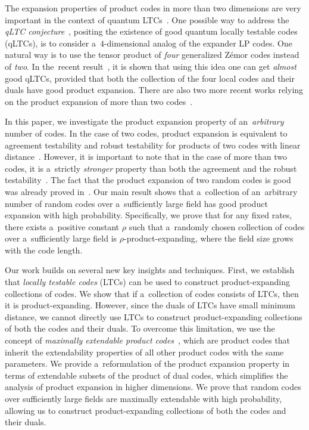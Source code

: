 \documentclass[conference]{IEEEtran}
\theoremstyle{plain}
\theoremstyle{definition}
\theoremstyle{remark}
\begin{document}
The expansion properties of product codes in more than two dimensions are very important in the context of quantum LTCs~\cite{Aharonov:2015}. One possible way to address the \emph{qLTC conjecture}~\cite{eldarLocalHamiltoniansWhose2017,crossQuantumLocallyTestable2024, dinurqLTC:2024}, positing the existence of good quantum locally testable codes (qLTCs), is to consider a~$4$-dimensional analog of the expander LP codes. One natural way is to use the tensor product of \emph{four} generalized Z\'{e}mor codes instead of \emph{two}.  In the~recent result~\cite{dinurqLTC:2024}, it is shown that using this idea one can get \emph{almost} good qLTCs, provided that both the collection of the four local codes and their duals have good product expansion. There are also two more recent works relying on the product expansion of more than two codes~\cite{golowichQuantumLDPCCodes2024, nguyenQuantumFaultTolerance2024}.

In this paper, we investigate the product expansion property of an~\emph{arbitrary} number of codes. In the case of two codes, product expansion is equivalent to agreement testability and robust testability for products of two codes with linear distance~\cite{kalachevTwosidedRobustlyTestable2023}. However, it is important to note that in the case of more than two codes, it is a~strictly \emph{stronger} property than both the agreement and the robust testability~\cite{Kalachev:example:2023}. The fact that the product expansion of two random codes is good was already proved in~\cite{Dinur:decoders, kalachevTwosidedRobustlyTestable2023}. Our main result shows that a~collection of an~arbitrary number of random codes over a~sufficiently large field has good product expansion with high probability.
Specifically, we prove that for any fixed rates, there exists a~positive constant $\rho$ such that a~randomly chosen collection of codes over a~sufficiently large field is $\rho$-product-expanding, where the field size grows with the code length.


Our work builds on several new key insights and techniques. First, we establish that \emph{locally testable codes} (LTCs) can be used to construct product-expanding collections of codes. We show that if a~collection of codes consists of LTCs, then it is product-expanding. However, since the duals of LTCs have small minimum distance, we cannot directly use LTCs to construct product-expanding collections of both the codes and their duals. To overcome this limitation, we use the concept of \emph{maximally extendable product codes}~\cite{panteleevMaximallyExtendableSheaf2024}, which are product codes that inherit the extendability properties of all other product codes with the same parameters. We provide a~reformulation of the product expansion property in terms of extendable subsets of the product of dual codes, which simplifies the analysis of product expansion in higher dimensions.
We prove that random codes over sufficiently large fields are maximally extendable with high probability, allowing us to construct product-expanding collections of both the codes and their duals.
\end{document}
